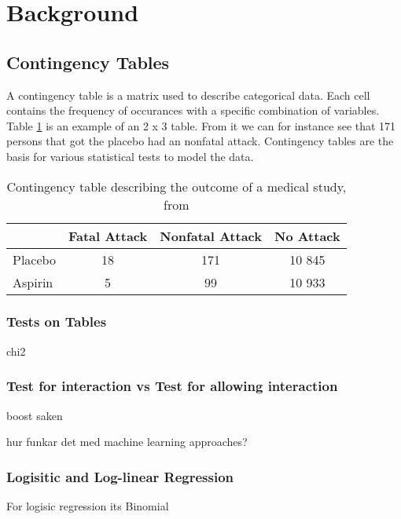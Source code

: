 \documentclass[10pt,a4paper]{article}
\begin{document}
\section{Background}

\subsection{Contingency Tables}
A contingency table is a matrix used to describe categorical data. Each cell contains the frequency of occurances with a specific combination of variables. Table \ref{table:contingency_table} is an example of an 2 x 3 table. From it we can for instance see that 171 persons that got the placebo had an nonfatal attack. Contingency tables are the basis for various statistical tests to model the data. \cite{agresti_categorical}

\begin{table}
\begin{tabular}{ l c c c }
  \hline
  & Fatal Attack & Nonfatal Attack & No Attack\\
  \hline
  Placebo & 18 & 171 & 10 845 \\
  Aspirin & 5 & 99 & 10 933 \\
  \hline  
\end{tabular}
\caption{Contingency table describing the outcome of a medical study, from \cite{agresti_categorical}}
\label{table:contingency_table}
\end{table}

\subsubsection{Tests on Tables}
chi2

\subsubsection{Test for interaction vs Test for allowing interaction}
boost saken

hur funkar det med machine learning approaches?

\subsubsection{Logisitic and Log-linear Regression}
For logisic regression its Binomial
\end{document}
